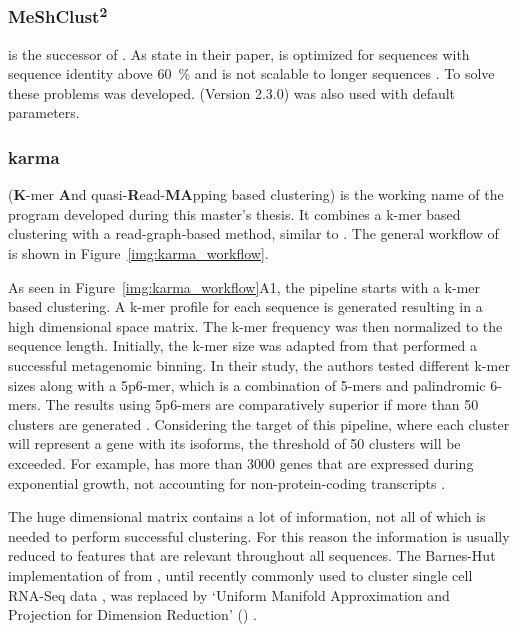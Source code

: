 \documentclass[12pt,a4paper,english]{article}
\begin{document}
\subsubsection*{MeShClust\textsuperscript{2}}
	\mclusttwo \citep{meshclust2:18} is the successor of \mclust. As \citeauthor{meshclust:18} state in their paper, \mclust is optimized for sequences with sequence identity above 60~\% and is not scalable to longer sequences \citep{meshclust:18}. To solve these problems \mclusttwo was developed. \mclusttwo (Version 2.3.0) was also used with default parameters.

\subsubsection*{karma}
	\label{sssec:karma}
	\karma (\textbf{K}-mer \textbf{A}nd quasi-\textbf{R}ead-\textbf{MA}pping based clustering) is the working name of the program developed during this master's thesis. It combines a k-mer based clustering with a read-graph-based method, similar to \grouper. The general workflow of \karma is shown in Figure~\ref{img:karma_workflow}.
	
	As seen in Figure~\ref{img:karma_workflow}A1, the pipeline starts with a k-mer based clustering. A k-mer profile for each sequence is generated resulting in a high dimensional space matrix. The k-mer frequency was then normalized to the sequence length. Initially, the k-mer size was adapted from \citeauthor{binning:16} \citep{binning:16} that performed a successful metagenomic binning. In their study, the authors tested different k-mer sizes along with a 5p6-mer, which is a combination of 5-mers and palindromic 6-mers. 
	The results using 5p6-mers are comparatively superior if more than 50 clusters are generated \citep{binning:16}.
	Considering the target of this pipeline, where each cluster will represent a gene with its isoforms, the threshold of 50 clusters will be exceeded. For example, \ecoli has more than 3000 genes that are expressed during exponential growth, not accounting for non-protein-coding transcripts \citep{ecoli:99}.
	
	The huge dimensional matrix contains a lot of information, not all of which is needed to perform successful clustering. For this reason the information is usually reduced to features that are relevant throughout all sequences. The Barnes-Hut implementation of \tsne from \citeauthor{binning:16} \citep{binning:16}, until recently commonly used to cluster single cell RNA-Seq data \citep{tSNE_common:19}, was replaced by `Uniform Manifold Approximation and Projection for Dimension Reduction' (\umap) \citep{umap:18}.
\end{document}
